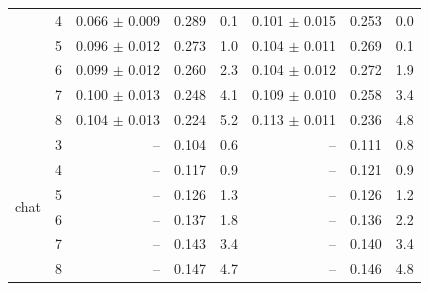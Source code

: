 \begin{tabular}{llrrrrrr}
 & 4 & 0.066 $\pm$ 0.009 & 0.289 & 0.1 & 0.101 $\pm$ 0.015 & 0.253 & 0.0 \\
 & 5 & 0.096 $\pm$ 0.012 & 0.273 & 1.0 & 0.104 $\pm$ 0.011 & 0.269 & 0.1 \\
 & 6 & 0.099 $\pm$ 0.012 & 0.260 & 2.3 & 0.104 $\pm$ 0.012 & 0.272 & 1.9 \\
 & 7 & 0.100 $\pm$ 0.013 & 0.248 & 4.1 & 0.109 $\pm$ 0.010 & 0.258 & 3.4 \\
 & 8 & 0.104 $\pm$ 0.013 & 0.224 & 5.2 & 0.113 $\pm$ 0.011 & 0.236 & 4.8 \\
\midrule
\multirow{6}{*}{chat} & 3 & -- & 0.104 & 0.6 & -- & 0.111 & 0.8 \\
 & 4 & -- & 0.117 & 0.9 & -- & 0.121 & 0.9 \\
 & 5 & -- & 0.126 & 1.3 & -- & 0.126 & 1.2 \\
 & 6 & -- & 0.137 & 1.8 & -- & 0.136 & 2.2 \\
 & 7 & -- & 0.143 & 3.4 & -- & 0.140 & 3.4 \\
 & 8 & -- & 0.147 & 4.7 & -- & 0.146 & 4.8 \\
\bottomrule
\end{tabular}
